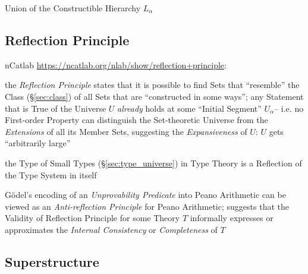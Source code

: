 Union of the Constructible Hierarchy $L_\alpha$



\subsection{Reflection Principle}\label{sec:reflection_principle}

nCatlab \url{https://ncatlab.org/nlab/show/reflection+principle}:

the \emph{Reflection Principle} states that it is possible to find
Sets that ``resemble'' the Class (\S\ref{sec:class}) of all Sets that
are ``constructed in some ways''; any Statement that is True of the
Universe $U$ \emph{already} holds at some ``Initial Segment''
$U_\alpha$-- i.e. no First-order Property can distinguish the
Set-theoretic Universe from the \emph{Extensions} of all its Member
Sets, suggesting the \emph{Expansiveness} of $U$: $U$ gets
``arbitrarily large''


the Type of Small Types (\S\ref{sec:type_universe}) in Type Theory is
a Reflection of the Type System in itself

G\"odel's encoding of an \emph{Unprovability Predicate} into Peano
Arithmetic can be viewed as an \emph{Anti-reflection Principle} for
Peano Arithmetic; suggests that the Validity of Reflection Principle
for some Theory $T$ informally expresses or approximates the
\emph{Internal Consistency} or \emph{Completeness} of $T$



\subsection{Superstructure}\label{sec:superstructure}


